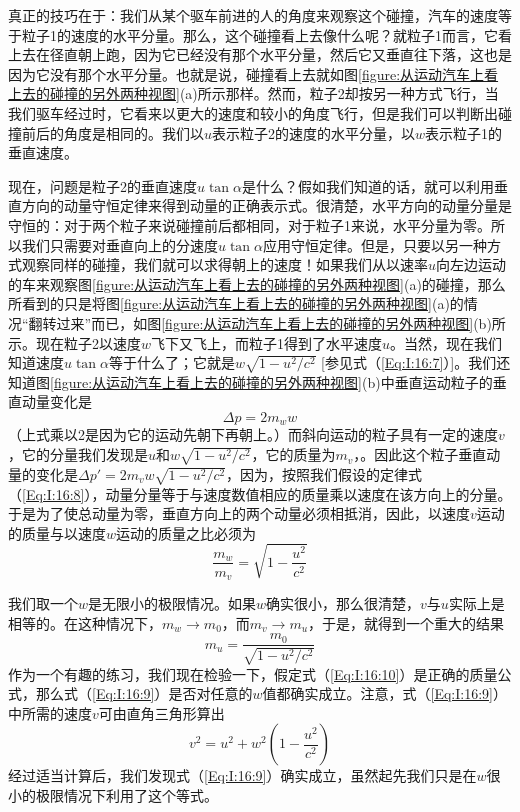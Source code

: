真正的技巧在于：我们从某个驱车前进的人的角度来观察这个碰撞，汽车的速度等于粒子1的速度的水平分量。那么，这个碰撞看上去像什么呢？就粒子1而言，它看上去在径直朝上跑，因为它已经没有那个水平分量，然后它又垂直往下落，这也是因为它没有那个水平分量。也就是说，碰撞看上去就如图\ref{figure:从运动汽车上看上去的碰撞的另外两种视图}(a)所示那样。然而，粒子2却按另一种方式飞行，当我们驱车经过时，它看来以更大的速度和较小的角度飞行，但是我们可以判断出碰撞前后的角度是相同的。我们以$u$表示粒子2的速度的水平分量，以$w$表示粒子1的垂直速度。

现在，问题是粒子2的垂直速度$u\tan\alpha$是什么？假如我们知道的话，就可以利用垂直方向的动量守恒定律来得到动量的正确表示式。很清楚，水平方向的动量分量是守恒的：对于两个粒子来说碰撞前后都相同，对于粒子1来说，水平分量为零。所以我们只需要对垂直向上的分速度$u\tan\alpha$应用守恒定律。但是，只要以另一种方式观察同样的碰撞，我们就可以求得朝上的速度！如果我们从以速率$u$向左边运动的车来观察图\ref{figure:从运动汽车上看上去的碰撞的另外两种视图}(a)的碰撞，那么所看到的只是将图\ref{figure:从运动汽车上看上去的碰撞的另外两种视图}(a)的情况“翻转过来”而已，如图\ref{figure:从运动汽车上看上去的碰撞的另外两种视图}(b)所示。现在粒子2以速度$w$飞下又飞上，而粒子1得到了水平速度$u$。当然，现在我们知道速度$u\tan\alpha$等于什么了；它就是$w\sqrt{1-u^2/c^2}$ [参见式（\ref{Eq:I:16:7}）]。我们还知道图\ref{figure:从运动汽车上看上去的碰撞的另外两种视图}(b)中垂直运动粒子的垂直动量变化是
\begin{equation*}
    \Delta p = 2m_w w
\end{equation*}
（上式乘以2是因为它的运动先朝下再朝上。）而斜向运动的粒子具有一定的速度$v$，它的分量我们发现是$u$和$w\sqrt{1-u^2/c^2}$，它的质量为$m_v$，。因此这个粒子垂直动量的变化是$\Delta p'=2m_vw\sqrt{1-u^2/c^2}$，因为，按照我们假设的定律式（\ref{Eq:I:16:8}），动量分量等于与速度数值相应的质量乘以速度在该方向上的分量。于是为了使总动量为零，垂直方向上的两个动量必须相抵消，因此，以速度$v$运动的质量与以速度$w$运动的质量之比必须为
\begin{equation}
    \label{Eq:I:16:9}
    \frac{m_w}{m_v}=\sqrt{1-\frac{u^2}{c^2}}
\end{equation}

我们取一个$w$是无限小的极限情况。如果$w$确实很小，那么很清楚，$v$与$u$实际上是相等的。在这种情况下，$m_w \to m_0$，而$m_v \to m_u$，于是，就得到一个重大的结果
\begin{equation}
    \label{Eq:I:16:10}
    m_u=\frac{m_0}{\sqrt{1-u^2/c^2}}
\end{equation}
作为一个有趣的练习，我们现在检验一下，假定式（\ref{Eq:I:16:10}）是正确的质量公式，那么式（\ref{Eq:I:16:9}）是否对任意的$w$值都确实成立。注意，式（\ref{Eq:I:16:9}）中所需的速度$v$可由直角三角形算出
\begin{equation*}
    v^2=u^2+w^2(1-\frac{u^2}{c^2})
\end{equation*}
经过适当计算后，我们发现式（\ref{Eq:I:16:9}）确实成立，虽然起先我们只是在$w$很小的极限情况下利用了这个等式。

